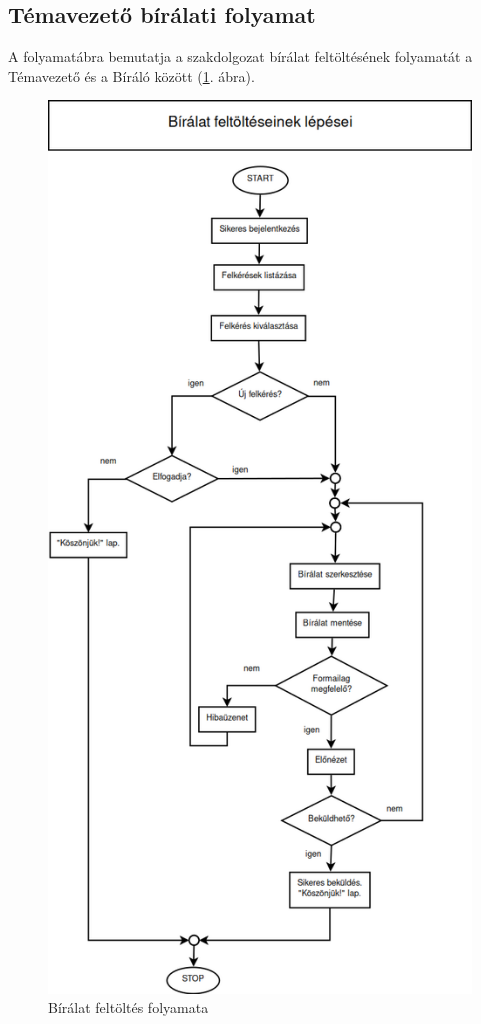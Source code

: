 \documentclass[a4paper,12pt]{article}
\begin{document}
\subsection{Témavezető bírálati folyamat}

A folyamatábra bemutatja a szakdolgozat bírálat feltöltésének folyamatát a Témavezető és a Bíráló között (\ref{fig:Biralat_Feltoltes}. ábra).

\begin{figure}
\centering
\includegraphics[scale=0.45]{images/Folyamatabra/Biralat_Feltoltes.png}
\caption{Bírálat feltöltés folyamata}
\label{fig:Biralat_Feltoltes}
\end{figure}
\end{document}
